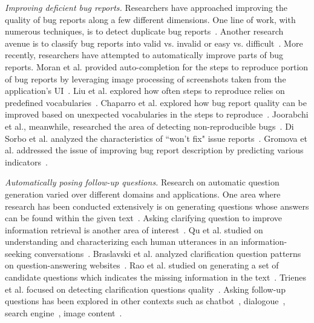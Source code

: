 \noindent
{\em Improving deficient bug reports.} Researchers have approached improving the quality of bug reports along a few different dimensions. One line of work, with numerous techniques, is to detect duplicate bug reports~\cite{chaparro19reformulating}. Another research avenue is to classify bug reports into valid vs. invalid or easy vs. difficult~\cite{fan20chaff,hooimeijer07modeling}. More recently, researchers have attempted to automatically improve parts of bug reports. Moran et al. provided auto-completion for the steps to reproduce portion of bug reports by leveraging image processing of screenshots taken from the application's UI~\cite{moran15autocompleting}. Liu et al. explored how often steps to reproduce relies on predefined vocabularies~\cite{liu2020automated}. Chaparro et al. explored how bug report quality can be improved based on unexpected vocabularies in the steps to reproduce~\cite{Chaparro2019AssessingTQ}. Joorabchi et al., meanwhile, researched the area of detecting non-reproducible bugs~\cite{erfani2014works}. Di Sorbo et al. analyzed the characteristics of ``won't fix" issue reports~\cite{Sorbo2019WontWF}. Gromova et al. addressed the issue of improving bug report description by predicting various indicators~\cite{gromova2019raising}.

\noindent
{\em Automatically posing follow-up questions.} Research on automatic question generation varied over different domains and applications. One area where research has been conducted extensively is on generating questions whose answers can be found within the given text~\cite{vanderwende2008importance, rus2011question, zhou2017neural, heilman2010good, duan2017question,  du2017learning}. Asking clarifying question to improve information retrieval is another area of interest~\cite{10.1145/3366423.3380126, 10.1145/3331184.3331265, stoyanchev2014towards}.  Qu et al. studied on understanding and characterizing each human utterances in an information-seeking conversations~\cite{10.1145/3209978.3210124}. Braslavski et al. analyzed clarification question patterns on question-answering websites~\cite{10.1145/3020165.3022149}. Rao et al. studied on generating a set of candidate questions which indicates the missing information in the text~\cite{rao-daume-iii-2018-learning}. Trienes et al. focused on detecting clarification questions quality~\cite{trienes2019identifying}. Asking follow-up questions has been explored in other contexts such as chatbot~\cite{Hancock2019LearningFD}, dialogoue~\cite{de2005implementing, de2003analysis}, search engine~\cite{Ren2020ConversationsWS}, image content~\cite{Mostafazadeh_2016}.
